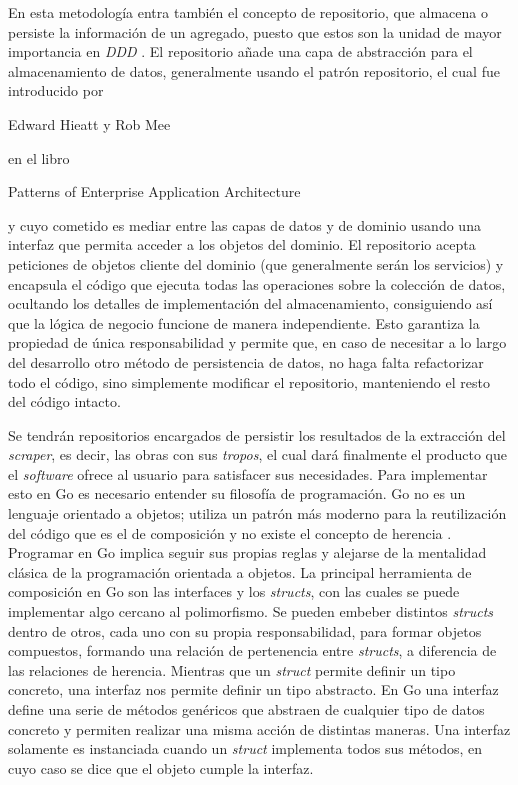 En esta metodología entra también el concepto de repositorio, que almacena o
persiste la información de un agregado, puesto que estos son la unidad de mayor
importancia en \textit{DDD} \cite{ddd_golang}. El repositorio añade una capa de
abstracción para el almacenamiento de datos, generalmente usando el patrón
repositorio, el cual fue introducido por \begin{otherlanguage}{english}Edward
Hieatt y Rob Mee\end{otherlanguage} en el libro
\begin{otherlanguage}{english} Patterns of Enterprise Application Architecture
\end{otherlanguage}\cite{fowler2002eea} y cuyo cometido es mediar entre las
capas de datos y de dominio usando una interfaz que permita acceder a los
objetos del dominio. El repositorio acepta peticiones de objetos cliente del
dominio (que generalmente serán los servicios) y encapsula el código que ejecuta
todas las operaciones sobre la colección de datos, ocultando los detalles de
implementación del almacenamiento, consiguiendo así que la lógica de negocio
funcione de manera independiente. Esto garantiza la propiedad de única
responsabilidad y permite que, en caso de necesitar a lo largo del desarrollo
otro método de persistencia de datos, no haga falta refactorizar todo el código,
sino simplemente modificar el repositorio, manteniendo el resto del código
intacto. 

Se tendrán repositorios encargados de persistir los resultados de la extracción
del \textit{scraper}, es decir, las obras con sus \textit{tropos}, el cual dará
finalmente el producto que el \textit{software} ofrece al usuario para
satisfacer sus necesidades. Para implementar esto en Go es necesario entender su
filosofía de programación. Go no es un lenguaje orientado a objetos; utiliza un
patrón más moderno para la reutilización del código que es el de composición y
no existe el concepto de herencia \cite{debnath_introduction_2022}. Programar en
Go implica seguir sus propias reglas y alejarse de la mentalidad clásica de la
programación orientada a objetos. La principal herramienta de composición en Go
son las interfaces y los \textit{structs}, con las cuales se puede implementar
algo cercano al polimorfismo. Se pueden embeber distintos \textit{structs}
dentro de otros, cada uno con su propia responsabilidad, para formar objetos
compuestos, formando una relación de pertenencia entre \textit{structs}, a
diferencia de las relaciones de herencia. Mientras que un \textit{struct}
permite definir un tipo concreto, una interfaz nos permite definir un tipo
abstracto. En Go una interfaz define una serie de métodos genéricos que abstraen
de cualquier tipo de datos concreto y permiten realizar una misma acción de
distintas maneras. Una interfaz solamente es instanciada cuando un
\textit{struct} implementa todos sus métodos, en cuyo caso se dice que el objeto
cumple la interfaz. 

